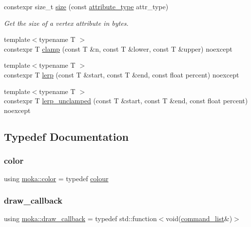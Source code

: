 \begin{DoxyCompactItemize}
constexpr size\+\_\+t \mbox{\hyperlink{namespacemoka_a4f125ee95d9889b23c3259d1fba4c2e4}{size}} (const \mbox{\hyperlink{namespacemoka_a1fe222f346eb65977e1069323023faa5}{attribute\+\_\+type}} attr\+\_\+type)
\begin{DoxyCompactList}\small\item\em Get the size of a vertex attribute in bytes. \end{DoxyCompactList}\item 
{\footnotesize template$<$typename T $>$ }\\constexpr T \mbox{\hyperlink{namespacemoka_a2486d1231c4edb9da9ec840669627aa5}{clamp}} (const T \&n, const T \&lower, const T \&upper) noexcept
\item 
{\footnotesize template$<$typename T $>$ }\\constexpr T \mbox{\hyperlink{namespacemoka_ad97379de09141d046fe34261117b09b9}{lerp}} (const T \&start, const T \&end, const float percent) noexcept
\item 
{\footnotesize template$<$typename T $>$ }\\constexpr T \mbox{\hyperlink{namespacemoka_af5a96c8550737bc497ab5f87af7c9596}{lerp\+\_\+unclamped}} (const T \&start, const T \&end, const float percent) noexcept
\end{DoxyCompactItemize}


\subsection{Typedef Documentation}
\mbox{\label{namespacemoka_a8fbd522082ce6449bc1e307f785aafe5}} 
\subsubsection{\texorpdfstring{color}{color}}
{\footnotesize\ttfamily using \mbox{\hyperlink{namespacemoka_a8fbd522082ce6449bc1e307f785aafe5}{moka\+::color}} = typedef \mbox{\hyperlink{classmoka_1_1colour}{colour}}}

\mbox{\label{namespacemoka_a23ee9e48e7a7d5b76db8d678e34a53e7}} 
\subsubsection{\texorpdfstring{draw\_callback}{draw\_callback}}
{\footnotesize\ttfamily using \mbox{\hyperlink{namespacemoka_a23ee9e48e7a7d5b76db8d678e34a53e7}{moka\+::draw\+\_\+callback}} = typedef std\+::function$<$void(\mbox{\hyperlink{classmoka_1_1command__list}{command\+\_\+list}}\&)$>$}

